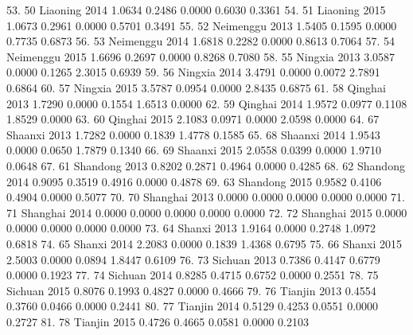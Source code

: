 53. {\VBAR}  50       Liaoning   2014   1.0634   0.2486   0.0000   0.6030   0.3361 {\VBAR}
 54. {\VBAR}  51       Liaoning   2015   1.0673   0.2961   0.0000   0.5701   0.3491 {\VBAR}
 55. {\VBAR}  52      Neimenggu   2013   1.5405   0.1595   0.0000   0.7735   0.6873 {\VBAR}
 56. {\VBAR}  53      Neimenggu   2014   1.6818   0.2282   0.0000   0.8613   0.7064 {\VBAR}
 57. {\VBAR}  54      Neimenggu   2015   1.6696   0.2697   0.0000   0.8268   0.7080 {\VBAR}
 58. {\VBAR}  55        Ningxia   2013   3.0587   0.0000   0.1265   2.3015   0.6939 {\VBAR}
 59. {\VBAR}  56        Ningxia   2014   3.4791   0.0000   0.0072   2.7891   0.6864 {\VBAR}
 60. {\VBAR}  57        Ningxia   2015   3.5787   0.0954   0.0000   2.8435   0.6875 {\VBAR}
 61. {\VBAR}  58        Qinghai   2013   1.7290   0.0000   0.1554   1.6513   0.0000 {\VBAR}
 62. {\VBAR}  59        Qinghai   2014   1.9572   0.0977   0.1108   1.8529   0.0000 {\VBAR}
 63. {\VBAR}  60        Qinghai   2015   2.1083   0.0971   0.0000   2.0598   0.0000 {\VBAR}
 64. {\VBAR}  67        Shaanxi   2013   1.7282   0.0000   0.1839   1.4778   0.1585 {\VBAR}
 65. {\VBAR}  68        Shaanxi   2014   1.9543   0.0000   0.0650   1.7879   0.1340 {\VBAR}
 66. {\VBAR}  69        Shaanxi   2015   2.0558   0.0399   0.0000   1.9710   0.0648 {\VBAR}
 67. {\VBAR}  61       Shandong   2013   0.8202   0.2871   0.4964   0.0000   0.4285 {\VBAR}
 68. {\VBAR}  62       Shandong   2014   0.9095   0.3519   0.4916   0.0000   0.4878 {\VBAR}
 69. {\VBAR}  63       Shandong   2015   0.9582   0.4106   0.4904   0.0000   0.5077 {\VBAR}
 70. {\VBAR}  70       Shanghai   2013   0.0000   0.0000   0.0000   0.0000   0.0000 {\VBAR}
 71. {\VBAR}  71       Shanghai   2014   0.0000   0.0000   0.0000   0.0000   0.0000 {\VBAR}
 72. {\VBAR}  72       Shanghai   2015   0.0000   0.0000   0.0000   0.0000   0.0000 {\VBAR}
 73. {\VBAR}  64         Shanxi   2013   1.9164   0.0000   0.2748   1.0972   0.6818 {\VBAR}
 74. {\VBAR}  65         Shanxi   2014   2.2083   0.0000   0.1839   1.4368   0.6795 {\VBAR}
 75. {\VBAR}  66         Shanxi   2015   2.5003   0.0000   0.0894   1.8447   0.6109 {\VBAR}
 76. {\VBAR}  73        Sichuan   2013   0.7386   0.4147   0.6779   0.0000   0.1923 {\VBAR}
 77. {\VBAR}  74        Sichuan   2014   0.8285   0.4715   0.6752   0.0000   0.2551 {\VBAR}
 78. {\VBAR}  75        Sichuan   2015   0.8076   0.1993   0.4827   0.0000   0.4666 {\VBAR}
 79. {\VBAR}  76        Tianjin   2013   0.4554   0.3760   0.0466   0.0000   0.2441 {\VBAR}
 80. {\VBAR}  77        Tianjin   2014   0.5129   0.4253   0.0551   0.0000   0.2727 {\VBAR}
 81. {\VBAR}  78        Tianjin   2015   0.4726   0.4665   0.0581   0.0000   0.2103 {\VBAR}
